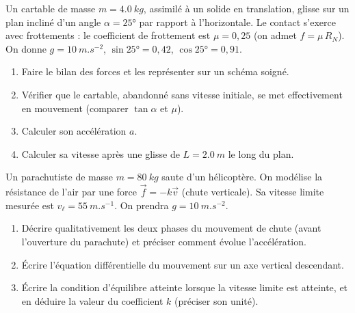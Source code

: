 \documentclass[11pt]{article}
\newcounter{popsec}
\newcounter{popsub}
\newcommand{\courssub}[1]{%
  \stepcounter{popsub}%
  \par\vspace{9pt}\noindent{\popxbold\fontsize{11.5}{13}\selectfont\color{popink}{\color{poporange}\thepopsec.\thepopsub}\hspace{6pt}#1}\par\nopagebreak\vspace{4pt}
}
\begin{document}
\begin{exercice}
Un cartable de masse $m = \SI{4,0}{kg}$, assimilé à un solide en translation, glisse sur un plan incliné d'un angle $\alpha = 25°$ par rapport à l'horizontale. Le contact s'exerce avec frottements : le coefficient de frottement est $\mu = 0{,}25$ (on admet $f = \mu\, R_N$). On donne $g = \SI{10}{m.s^{-2}}$, $\sin 25° = 0{,}42$, $\cos 25° = 0{,}91$.
\begin{enumerate}
\item Faire le bilan des forces et les représenter sur un schéma soigné.
\item Vérifier que le cartable, abandonné sans vitesse initiale, se met effectivement en mouvement (comparer $\tan\alpha$ et $\mu$).
\item Calculer son accélération $a$.
\item Calculer sa vitesse après une glisse de $L = \SI{2,0}{m}$ le long du plan.
\end{enumerate}
\end{exercice}

\begin{exercice}[Le parachutiste]
Un parachutiste de masse $m = \SI{80}{kg}$ saute d'un hélicoptère. On modélise la résistance de l'air par une force $\vec{f} = -k\vec{v}$ (chute verticale). Sa vitesse limite mesurée est $v_{\ell} = \SI{55}{m.s^{-1}}$. On prendra $g = \SI{10}{m.s^{-2}}$.
\begin{enumerate}
\item Décrire qualitativement les deux phases du mouvement de chute (avant l'ouverture du parachute) et préciser comment évolue l'accélération.
\item Écrire l'équation différentielle du mouvement sur un axe vertical descendant.
\item Écrire la condition d'équilibre atteinte lorsque la vitesse limite est atteinte, et en déduire la valeur du coefficient $k$ (préciser son unité).
\end{enumerate}
\end{exercice}

\courssub{Je me prépare au Bac}
\end{document}
